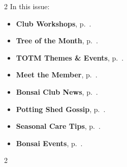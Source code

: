 \setlength{\columnsep}{-5.0cm}
\begin{multicols}{2}
    \noindent\textsf{In this issue:}
    \begin{itemize}
        \item \textsf{\textbf{Club Workshops}}, p.~\pageref{2025-12-workshop-mep}.
        \item \textsf{\textbf{Tree of the Month}}, p.~\pageref{2025-12-totm}.
        \item \textsf{\textbf{TOTM Themes \& Events}}, p.~\pageref{2025-12-themes}.
        \item \textsf{\textbf{Meet the Member}}, p.~\pageref{2025-12-roots}.
        \item \textsf{\textbf{Bonsai Club News}}, p.~\pageref{2025-12-news}.
        \item \textsf{\textbf{Potting Shed Gossip}}, p.~\pageref{2025-12-gossip}.
        \item \textsf{\textbf{Seasonal Care Tips}}, p.~\pageref{2025-12-care}.
        \item \textsf{\textbf{Bonsai Events}}, p.~\pageref{2025-12-events}.
    \end{itemize}
    \vfill\null
    \columnbreak

    
\end{multicols}
\pagebreak

\setlength{\columnsep}{0.5cm}
\begin{multicols}{2}
    
    
    
%    
%    
    
    
    
%    
%    
    
\end{multicols}
